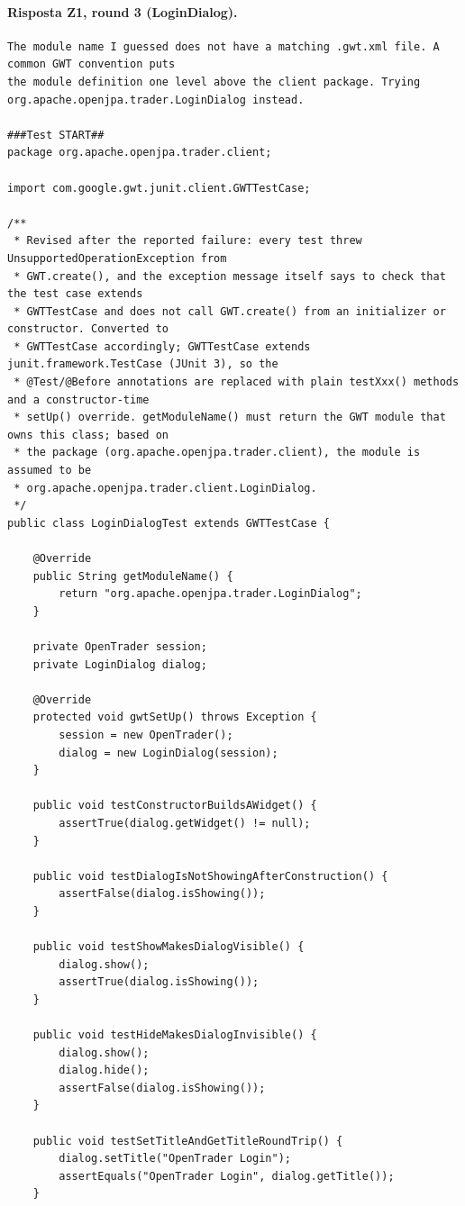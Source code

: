 \paragraph*{Risposta Z1, round 3 (LoginDialog).}
\label{risposta:ld-z1-r3}
\begin{lstlisting}
The module name I guessed does not have a matching .gwt.xml file. A common GWT convention puts
the module definition one level above the client package. Trying
org.apache.openjpa.trader.LoginDialog instead.

###Test START##
package org.apache.openjpa.trader.client;

import com.google.gwt.junit.client.GWTTestCase;

/**
 * Revised after the reported failure: every test threw UnsupportedOperationException from
 * GWT.create(), and the exception message itself says to check that the test case extends
 * GWTTestCase and does not call GWT.create() from an initializer or constructor. Converted to
 * GWTTestCase accordingly; GWTTestCase extends junit.framework.TestCase (JUnit 3), so the
 * @Test/@Before annotations are replaced with plain testXxx() methods and a constructor-time
 * setUp() override. getModuleName() must return the GWT module that owns this class; based on
 * the package (org.apache.openjpa.trader.client), the module is assumed to be
 * org.apache.openjpa.trader.client.LoginDialog.
 */
public class LoginDialogTest extends GWTTestCase {

    @Override
    public String getModuleName() {
        return "org.apache.openjpa.trader.LoginDialog";
    }

    private OpenTrader session;
    private LoginDialog dialog;

    @Override
    protected void gwtSetUp() throws Exception {
        session = new OpenTrader();
        dialog = new LoginDialog(session);
    }

    public void testConstructorBuildsAWidget() {
        assertTrue(dialog.getWidget() != null);
    }

    public void testDialogIsNotShowingAfterConstruction() {
        assertFalse(dialog.isShowing());
    }

    public void testShowMakesDialogVisible() {
        dialog.show();
        assertTrue(dialog.isShowing());
    }

    public void testHideMakesDialogInvisible() {
        dialog.show();
        dialog.hide();
        assertFalse(dialog.isShowing());
    }

    public void testSetTitleAndGetTitleRoundTrip() {
        dialog.setTitle("OpenTrader Login");
        assertEquals("OpenTrader Login", dialog.getTitle());
    }


\end{lstlisting}
